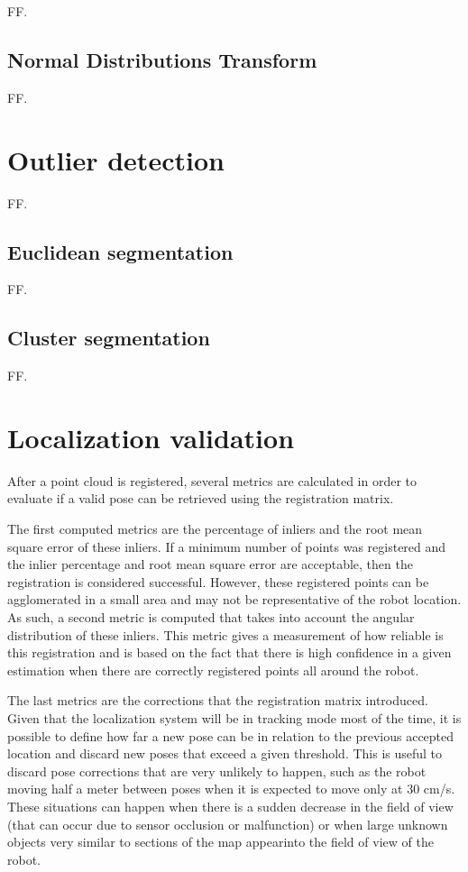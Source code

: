 FF.


\subsection{Normal Distributions Transform}

FF.



\section{Outlier detection}

FF.


\subsection{Euclidean segmentation}

FF.


\subsection{Cluster segmentation}

FF.



\section{Localization validation}

After a point cloud is registered, several metrics are calculated in order to evaluate if a valid pose can be retrieved using the registration matrix.

The first computed metrics are the percentage of inliers and the root mean square error of these inliers. If a minimum number of points was registered and the inlier percentage and root mean square error are acceptable, then the registration is considered successful. However, these registered points can be agglomerated in a small area and may not be representative of the robot location. As such, a second metric is computed that takes into account the angular distribution of these inliers. This metric gives a measurement of how reliable is this registration and is based on the fact that there is high confidence in a given estimation when there are correctly registered points all around the robot.

The last metrics are the corrections that the registration matrix introduced. Given that the localization system will be in tracking mode most of the time, it is possible to define how far a new pose can be in relation to the previous accepted location and discard new poses that exceed a given threshold. This is useful to discard pose corrections that are very unlikely to happen, such as the robot moving half a meter between poses when it is expected to move only at 30 cm/s. These situations can happen when there is a sudden decrease in the field of view (that can occur due to sensor occlusion or malfunction) or when  large unknown objects very similar to sections of the map appearinto the field of view of the robot.


